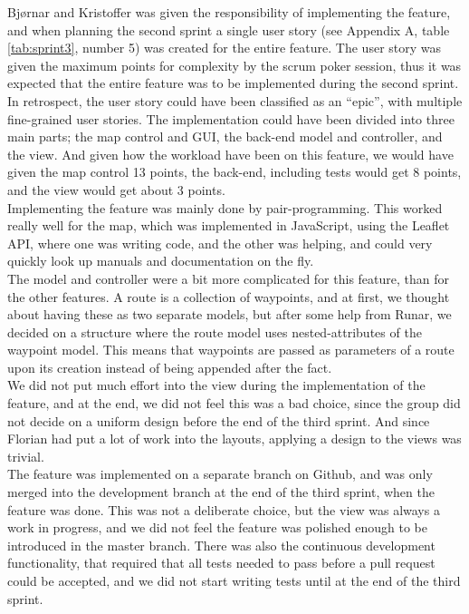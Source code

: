 \documentclass[a4paper]{article}
\begin{document}
\noindent
Bjørnar and Kristoffer was given the responsibility of implementing the feature, and when planning the second sprint a single user story (see Appendix A, table \ref{tab:sprint3}, number 5) was created for the entire feature. The user story was given the maximum points for complexity by the scrum poker session, thus it was expected that the entire feature was to be implemented during the second sprint. \\

\noindent
In retrospect, the user story could have been classified as an “epic”, with multiple fine-grained user stories. The implementation could have been divided into three main parts; the map control and GUI, the back-end model and controller, and the view. And given how the workload have been on this feature, we would have given the map control 13 points, the back-end, including tests would get 8 points, and the view would get about 3 points. \\

\noindent
Implementing the feature was mainly done by pair-programming. This worked really well for the map, which was implemented in JavaScript, using the Leaflet API, where one was writing code, and the other was helping, and could very quickly look up manuals and documentation on the fly. \\

\noindent
The model and controller were a bit more complicated for this feature, than for the other features. A route is a collection of waypoints, and at first, we thought about having these as two separate models, but after some help from Runar, we decided on a structure where the route model uses nested-attributes of the waypoint model. This means that waypoints are passed as parameters of a route upon its creation instead of being appended after the fact. \\

\noindent
We did not put much effort into the view during the implementation of the feature, and at the end, we did not feel this was a bad choice, since the group did not decide on a uniform design before the end of the third sprint. And since Florian had put a lot of work into the layouts, applying a design to the views was trivial. \\

\noindent
The feature was implemented on a separate branch on Github, and was only merged into the development branch at the end of the third sprint, when the feature was done. This was not a deliberate choice, but the view was always a work in progress, and we did not feel the feature was polished enough to be introduced in the master branch. There was also the continuous development functionality, that required that all tests needed to pass before a pull request could be accepted, and we did not start writing tests until at the end of the third sprint. \\
\end{document}
